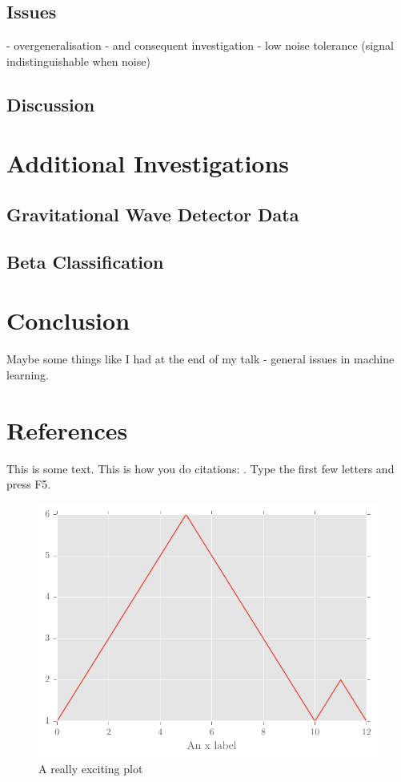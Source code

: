 \documentclass[a4paper]{jpconf}
\begin{document}
	\subsection{Issues}
		 - overgeneralisation - and consequent investigation
		 - low noise tolerance (signal indistinguishable when noise)
		 
	\subsection{Discussion}

\section{Additional Investigations}
	\subsection{Gravitational Wave Detector Data}
	\subsection{Beta Classification}
	
\section{Conclusion}
	Maybe some things like I had at the end of my talk - general issues in machine learning.
	
\section*{References} 

This is some text. This is how you do citations: \cite{}. Type the first few letters and press F5.
\begin{center}
    \begin{figure}
            \includegraphics[width=\textwidth]{testMatplotlibPlot.pdf}
            \caption{A really exciting plot}
    \end{figure}
\end{center}
\end{document}
